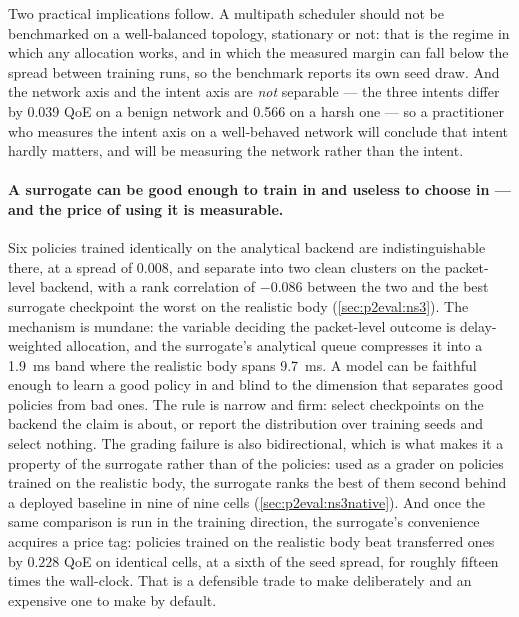 Two practical implications follow. A multipath scheduler should not be benchmarked on a well-balanced
topology, stationary or not: that is the regime in which any allocation works, and in which the measured
margin can fall below the spread between training runs, so the benchmark reports its own seed draw. And
the network axis and the intent axis are \emph{not} separable --- the three intents differ by 0.039 QoE
on a benign network and 0.566 on a harsh one --- so a practitioner who measures the intent axis on a
well-behaved network will conclude that intent hardly matters, and will be measuring the network rather
than the intent.

\paragraph{A surrogate can be good enough to train in and useless to choose in --- and the price of
using it is measurable.} Six policies trained
identically on the analytical backend are indistinguishable there, at a spread of 0.008, and separate
into two clean clusters on the packet-level backend, with a rank correlation of $-0.086$ between the two
and the best surrogate checkpoint the worst on the realistic body (\cref{sec:p2eval:ns3}). The mechanism
is mundane: the variable deciding the packet-level outcome is delay-weighted allocation, and the
surrogate's analytical queue compresses it into a \SI{1.9}{\milli\second} band where the realistic body
spans \SI{9.7}{\milli\second}. A model can be faithful enough to learn a good policy in and blind to the
dimension that separates good policies from bad ones. The rule is narrow and firm: select checkpoints on
the backend the claim is about, or report the distribution over training seeds and select nothing. The
grading failure is also bidirectional, which is what makes it a property of the surrogate rather than of
the policies: used as a grader on policies trained on the realistic body, the surrogate ranks the best
of them second behind a deployed baseline in nine of nine cells
(\cref{sec:p2eval:ns3native}). And once the same comparison is run in the training direction, the
surrogate's convenience acquires a price tag: policies trained on the realistic body beat transferred
ones by $0.228$ QoE on identical cells, at a sixth of the seed spread, for roughly fifteen times the
wall-clock. That is a defensible trade to make deliberately and an expensive one to make by default.

